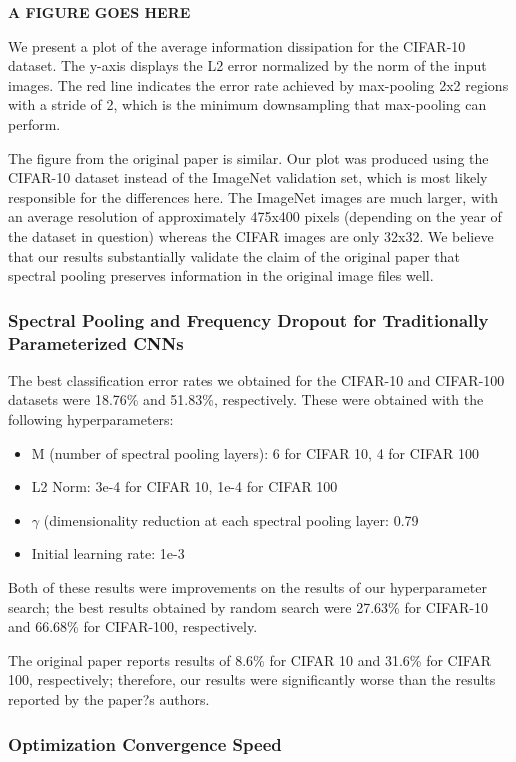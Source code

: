 \documentclass[10pt,journal,compsoc]{IEEEtran}
\begin{document}
\textbf{A FIGURE GOES HERE}

We present a plot of the average information dissipation for the CIFAR-10 dataset. The y-axis displays the L2 error normalized by the norm of the input images. The red line indicates the error rate achieved by max-pooling 2x2 regions with a stride of 2, which is the minimum downsampling that max-pooling can perform. 

The figure from the original paper is similar. Our plot was produced using the CIFAR-10 dataset instead of the ImageNet validation set, which is most likely responsible for the differences here. The ImageNet images are much larger, with an average resolution of approximately 475x400 pixels (depending on the year of the dataset in question) whereas the CIFAR images are only 32x32. We believe that our results substantially validate the claim of the original paper that spectral pooling preserves information in the original image files well.

\subsubsection{Spectral Pooling and Frequency Dropout for Traditionally Parameterized CNNs}

The best classification error rates we obtained for the CIFAR-10 and CIFAR-100 datasets were 18.76\% and 51.83\%, respectively. These were obtained with the following hyperparameters:

\begin{itemize}
\item M (number of spectral pooling layers): 6 for CIFAR 10, 4 for CIFAR 100
\item L2 Norm: 3e-4 for CIFAR 10, 1e-4 for CIFAR 100
\item $\gamma$ (dimensionality reduction at each spectral pooling layer: 0.79
\item Initial learning rate: 1e-3
\end{itemize}

Both of these results were improvements on the results of our hyperparameter search; the best results obtained by random search were 27.63\% for CIFAR-10 and 66.68\% for CIFAR-100, respectively.

The original paper reports results of 8.6\% for CIFAR 10 and 31.6\% for CIFAR 100, respectively; therefore, our results were significantly worse than the results reported by the paper?s authors. 

\subsubsection{Optimization Convergence Speed}
\end{document}
